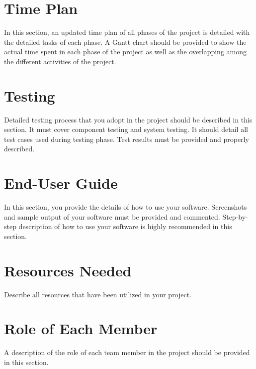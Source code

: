\documentclass[pdftex,10pt,a4paper,oneside]{article}
\begin{document}
\section{Time Plan}
In this section, an updated time plan of all phases of the project is detailed with the detailed tasks of each phase. A Gantt chart should be provided to show the actual time spent in each phase of the project as well as the overlapping among the different activities of the project.

\section{Testing}
Detailed testing process that you adopt in the project should be described in this section. It
must cover component testing and system testing. It should detail all test cases used during
testing phase. Test results must be provided and properly described.

\section{End-User Guide}
In this section, you provide the details of how to use your software. Screenshots and sample
output of your software must be provided and commented. Step-by-step description of how
to use your software is highly recommended in this section.

\section{Resources Needed}
Describe all resources that have been utilized in your project.

\section{Role of Each Member}
A description of the role of each team member in the project should be provided in this section.



\end{document}
